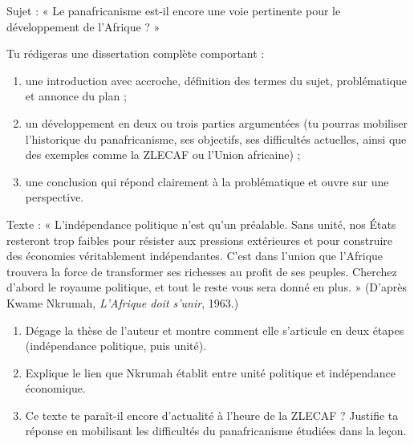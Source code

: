 \documentclass[11pt]{article}
\newcounter{popsec}
\newcounter{popsub}
\newcommand{\courssub}[1]{%
  \stepcounter{popsub}%
  \par\vspace{9pt}\noindent{\popxbold\fontsize{11.5}{13}\selectfont\color{popink}{\color{poporange}\thepopsec.\thepopsub}\hspace{6pt}#1}\par\nopagebreak\vspace{4pt}
}
\begin{document}
\courssub{Je me prépare au Bac}

\begin{exercice}
Sujet : « Le panafricanisme est-il encore une voie pertinente pour le développement de l'Afrique ? »

Tu rédigeras une dissertation complète comportant :
\begin{enumerate}
\item une introduction avec accroche, définition des termes du sujet, problématique et annonce du plan ;
\item un développement en deux ou trois parties argumentées (tu pourras mobiliser l'historique du panafricanisme, ses objectifs, ses difficultés actuelles, ainsi que des exemples comme la ZLECAF ou l'Union africaine) ;
\item une conclusion qui répond clairement à la problématique et ouvre sur une perspective.
\end{enumerate}
\end{exercice}

\begin{exercice}
Texte : « L'indépendance politique n'est qu'un préalable. Sans unité, nos États resteront trop faibles pour résister aux pressions extérieures et pour construire des économies véritablement indépendantes. C'est dans l'union que l'Afrique trouvera la force de transformer ses richesses au profit de ses peuples. Cherchez d'abord le royaume politique, et tout le reste vous sera donné en plus. » (D'après Kwame Nkrumah, \emph{L'Afrique doit s'unir}, 1963.)
\begin{enumerate}
\item Dégage la thèse de l'auteur et montre comment elle s'articule en deux étapes (indépendance politique, puis unité).
\item Explique le lien que Nkrumah établit entre unité politique et indépendance économique.
\item Ce texte te paraît-il encore d'actualité à l'heure de la ZLECAF ? Justifie ta réponse en mobilisant les difficultés du panafricanisme étudiées dans la leçon.
\end{enumerate}
\end{exercice}
\end{document}
